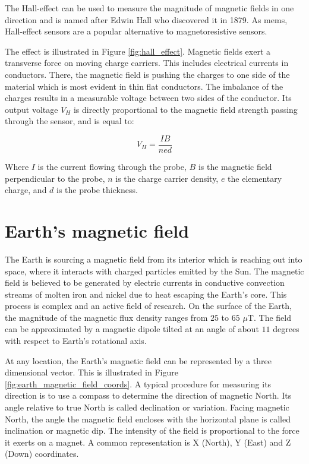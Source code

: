 The Hall-effect can be used to measure the magnitude of magnetic fields in one direction and is named after Edwin Hall who discovered it in 1879. As \gls{mems}, Hall-effect sensors are a popular alternative to magnetoresistive sensors.\cite{Hall1878}\cite{demtroeder_hall}

The effect is illustrated in Figure \ref{fig:hall_effect}. Magnetic fields exert a transverse force on moving charge carriers. This includes electrical currents in conductors. There, the magnetic field is pushing the charges to one side of the material which is most evident in thin flat conductors. The imbalance of the charges results in a measurable voltage between two sides of the conductor. Its output voltage $V_H$ is directly proportional to the magnetic field strength passing through the sensor, and is equal to:\cite{demtroeder_hall}

\begin{equation}
\label{eq:hall_effect}
    V_H = \frac{I B}{n e d}
\end{equation}

Where $I$ is the current flowing through the probe, $B$ is the magnetic field perpendicular to the probe, $n$ is the charge carrier density, $e$ the elementary charge, and $d$ is the probe thickness.

\section{Earth's magnetic field}

The Earth is sourcing a magnetic field from its interior which is reaching out into space, where it interacts with charged particles emitted by the Sun. The magnetic field is believed to be generated by electric currents in conductive convection streams of molten iron and nickel due to heat escaping the Earth's core. This process is complex and an active field of research. On the surface of the Earth, the magnitude of the magnetic flux density ranges from $25$ to $65$ $\mu$T. The field can be approximated by a magnetic dipole tilted at an angle of about $11$ degrees with respect to Earth's rotational axis.\cite{earth_magnetic_bible}\cite{earth_magnetic}

At any location, the Earth's magnetic field can be represented by a three dimensional vector. This is illustrated in Figure \ref{fig:earth_magnetic_field_coords}. A typical procedure for measuring its direction is to use a compass to determine the direction of magnetic North. Its angle relative to true North is called declination or variation. Facing magnetic North, the angle the magnetic field encloses with the horizontal plane is called inclination or magnetic dip. The intensity of the field is proportional to the force it exerts on a magnet. A common representation is X (North), Y (East) and Z (Down) coordinates.\cite{earth_magnetic}\cite{WWM2015}

